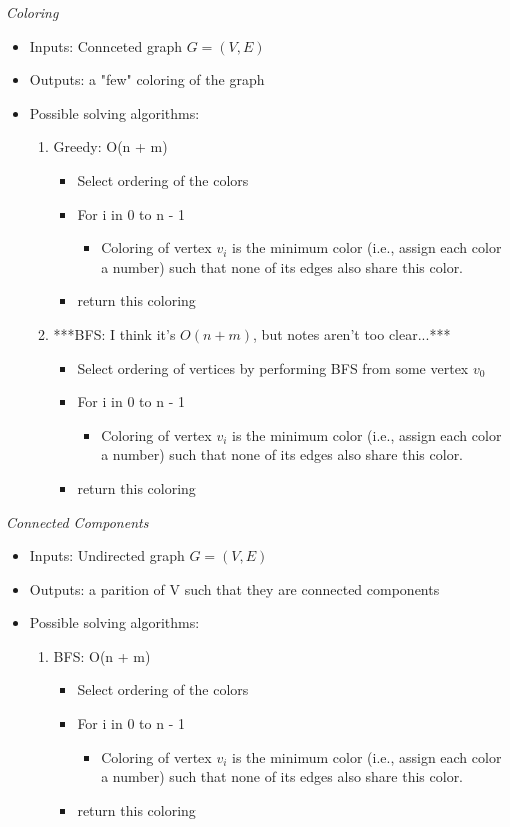 \documentclass{article}
\begin{document}
\emph{Coloring}
\begin{itemize}
  \item Inputs: Connceted graph $G = (V,E)$
  \item Outputs: a "few" coloring of the graph
  \item Possible solving algorithms:
  \begin{enumerate}
    \item Greedy: O(n + m)
    \begin{itemize}
      \item Select ordering of the colors
      \item For i in 0 to n - 1
      \begin{itemize}
        \item Coloring of vertex $v_{i}$ is the minimum color (i.e., assign each color a number) such that
        none of its edges also share this color.
      \end{itemize}
      \item return this coloring
    \end{itemize}
    \item ***BFS: I think it's $O(n + m)$, but notes aren't too clear...***
    \begin{itemize}
      \item Select ordering of vertices by performing BFS from some vertex $v_{0}$
      \item For i in 0 to n - 1
      \begin{itemize}
        \item Coloring of vertex $v_{i}$ is the minimum color (i.e., assign each color a number) such that
        none of its edges also share this color.
      \end{itemize}
      \item return this coloring
    \end{itemize}
  \end{enumerate}
\end{itemize}

\emph{Connected Components}
\begin{itemize}
  \item Inputs: Undirected graph $G = (V,E)$
  \item Outputs: a parition of V such that they are connected components
  \item Possible solving algorithms:
  \begin{enumerate}
    \item BFS: O(n + m)
    \begin{itemize}
      \item Select ordering of the colors
      \item For i in 0 to n - 1
      \begin{itemize}
        \item Coloring of vertex $v_{i}$ is the minimum color (i.e., assign each color a number) such that
        none of its edges also share this color.
      \end{itemize}
      \item return this coloring
    \end{itemize}
  \end{enumerate}
\end{itemize}
\end{document}
